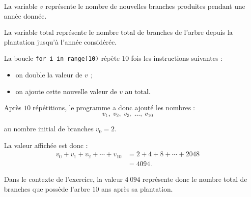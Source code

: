 \begin{enumerate}
\begin{enumerate}
					La variable $v$ représente le nombre de nouvelles branches produites pendant une année donnée.
					
					La variable $\text{total}$ représente le nombre total de branches de l'arbre depuis la plantation jusqu'à l'année considérée.
					
					La boucle \texttt{for i in range(10)} répète $10$ fois les instructions suivantes :
					\begin{itemize}[left=5mm,label={\textbullet~~}]
						\item on double la valeur de $v$ ;
						\item on ajoute cette nouvelle valeur de $v$ au total.
					\end{itemize}
					
					Après $10$ répétitions, le programme a donc ajouté les nombres :
					\[
					v_1,\ v_2,\ v_3,\ \ldots,\ v_{10}
					\]
					
					au nombre initial de branches $v_0=2$.
					
					La valeur affichée est donc :
					\begin{align*}
						v_0+v_1+v_2+\cdots+v_{10}
						&=2+4+8+\cdots+2048\\
						&=4094.
					\end{align*}
					
					Dans le contexte de l'exercice, la valeur $4\ 094$ représente donc le nombre total de branches que possède l'arbre $10$ ans après sa plantation.
				\end{enumerate}
			\end{enumerate}

\clearpage
